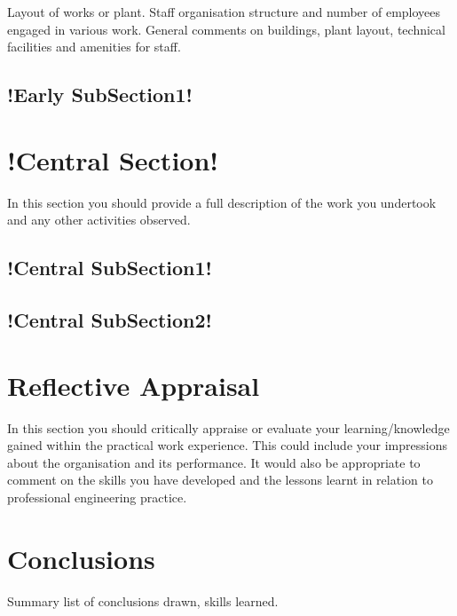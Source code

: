 \documentclass[pdftex, 12pt, a4paper, twoside]{article} %
\let\oldsection\section
\def\section{\cleardoublepage\oldsection}
\begin{document}
Layout of works or plant.
Staff organisation structure and number of employees engaged in various work.
General comments on buildings, plant layout, technical facilities and amenities for staff.
\lipsum[1-2]

\subsection{!Early SubSection1!}
\lipsum[1-2]

\section{!Central Section!}
\label{sec:centralsection}
In this section you should provide a full description of the work you undertook and any other activities observed.
\lipsum[1-2]

\subsection{!Central SubSection1!}
\lipsum[1-2]

\subsection{!Central SubSection2!}
\lipsum[1-2]


\section{Reflective Appraisal}
\label{sec:reflectiveappraisal}
In this section you should critically appraise or evaluate your learning/knowledge gained within the practical work experience. This could include
your impressions about the organisation and its performance. It would also be appropriate to comment on the skills you have developed and the lessons learnt in relation to professional engineering practice.
\lipsum[1-2]


\section{Conclusions}
\label{sec:conclusions}
Summary list of conclusions drawn, skills learned.
\lipsum[1-2]

%
%

\end{document}
